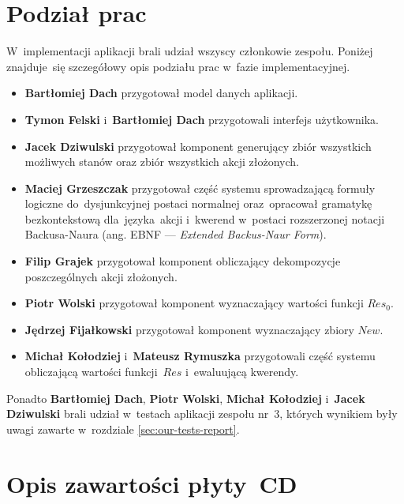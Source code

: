 \documentclass[11pt,a4paper]{article}
\begin{document}
\section{Podział prac}

W~implementacji aplikacji brali udział wszyscy członkowie zespołu.
Poniżej znajduje~się szczegółowy opis podziału prac w~fazie implementacyjnej.

\begin{itemize}
    \item \textbf{Bartłomiej Dach} przygotował model danych aplikacji.
    \item \textbf{Tymon Felski} i~\textbf{Bartłomiej Dach} przygotowali interfejs użytkownika.
    \item \textbf{Jacek Dziwulski} przygotował komponent generujący zbiór wszystkich możliwych stanów oraz zbiór wszystkich akcji złożonych.
    \item \textbf{Maciej Grzeszczak} przygotował część systemu sprowadzającą formuły logiczne do~dysjunkcyjnej postaci normalnej oraz~opracował gramatykę bezkontekstową dla~języka~akcji i~kwerend w~postaci rozszerzonej notacji Backusa-Naura (ang. EBNF --- \emph{Extended Backus-Naur Form}).
    \item \textbf{Filip Grajek} przygotował komponent obliczający dekompozycje poszczególnych akcji złożonych.
    \item \textbf{Piotr Wolski} przygotował komponent wyznaczający wartości funkcji ${Res}_0$.
    \item \textbf{Jędrzej Fijałkowski} przygotował komponent wyznaczający zbiory $New$.
    \item \textbf{Michał Kołodziej} i~\textbf{Mateusz Rymuszka} przygotowali część systemu obliczającą wartości funkcji~$Res$ i~ewaluującą kwerendy.
\end{itemize}

Ponadto \textbf{Bartłomiej Dach}, \textbf{Piotr Wolski}, \textbf{Michał Kołodziej} i~\textbf{Jacek Dziwulski} brali udział w~testach aplikacji zespołu nr~3, których wynikiem były uwagi zawarte w~rozdziale \ref{sec:our-tests-report}.

\section{Opis zawartości płyty~CD}
\end{document}
